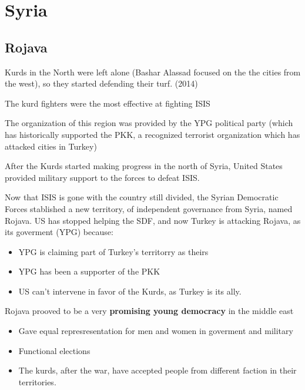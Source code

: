\section{Syria} 

\subsection{Rojava}

Kurds in the North were left alone (Bashar Alassad focused on the the cities from the west), so they started defending their turf. (2014)

The kurd fighters were the most effective at fighting ISIS

The organization of this region was provided by the YPG political party (which has historically supported the PKK, a recognized terrorist organization which has attacked cities in Turkey)

After the Kurds started making progress in the north of Syria, United States provided military support to the forces to defeat ISIS.

Now that ISIS is gone with the country still divided, the Syrian Democratic Forces stablished a new territory, of independent governance from Syria, named Rojava. US has stopped helping the SDF, and now Turkey is attacking Rojava, as its goverment (YPG) because:
\begin{itemize}
    \item YPG is claiming part of Turkey's territorry as theirs
    \item YPG has been a supporter of the PKK
    \item US can't intervene in favor of the Kurds, as Turkey is its ally.
\end{itemize}

Rojava prooved to be a very \textbf{promising young democracy}  in the middle east
\begin{itemize}
    \item Gave equal represresentation for men and women in goverment and military
    \item Functional elections
    \item The kurds, after the war, have accepted people from different faction in their territories.
\end{itemize}


\vfill